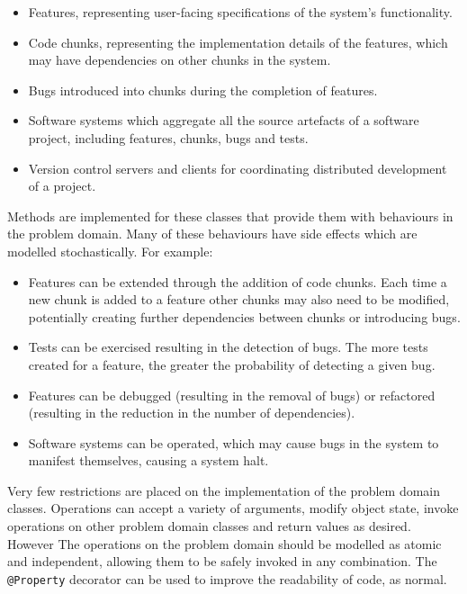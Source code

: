 \documentclass{sig-alternate}
\begin{document}
\begin{itemize}
\item Features, representing user-facing specifications of the system's functionality.
\item Code chunks, representing the implementation details of the features, which may have dependencies on other chunks
  in the system.
\item Bugs introduced into chunks during the completion of features.  
\item Software systems which aggregate all the source artefacts of a software project, including features, chunks, bugs
  and tests.
\item Version control servers and clients for coordinating distributed development of a project.

\end{itemize}

Methods are implemented for these classes that provide them with behaviours in the problem domain. Many of these
behaviours have side effects which are modelled stochastically. For example:

\begin{itemize}

\item Features can be extended through the addition of code chunks.  Each time a new chunk is added to a feature other
  chunks may also need to be modified, potentially creating further dependencies between chunks or introducing bugs.

\item Tests can be exercised resulting in the detection of bugs.  The more tests created for a feature, the greater the
  probability of detecting a given bug.

\item Features can be debugged (resulting in the removal of bugs) or refactored (resulting in the reduction in the
  number of dependencies).

\item Software systems can be operated, which may cause bugs in the system to manifest themselves, causing a system
  halt.

\end{itemize}

Very few restrictions are placed on the implementation of the problem domain classes.  Operations can accept a variety
of arguments, modify object state, invoke operations on other problem domain classes and return values as desired.
However The operations on the problem domain should be modelled as atomic and independent, allowing them to be safely
invoked in any combination.  The \lstinline!@Property! decorator can be used to improve the readability of code, as
normal.
\end{document}
